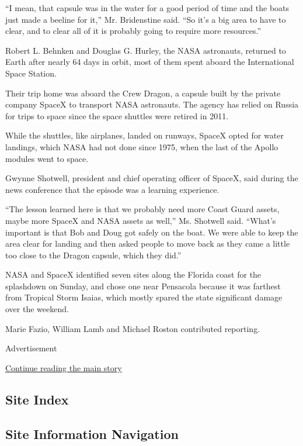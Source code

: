 ``I mean, that capsule was in the water for a good period of time and
the boats just made a beeline for it,'' Mr. Bridenstine said. ``So it's
a big area to have to clear, and to clear all of it is probably going to
require more resources.''

Robert L. Behnken and Douglas G. Hurley, the NASA astronauts, returned
to Earth after nearly 64 days in orbit, most of them spent aboard the
International Space Station.

Their trip home was aboard the Crew Dragon, a capsule built by the
private company SpaceX to transport NASA astronauts. The agency has
relied on Russia for trips to space since the space shuttles were
retired in 2011.

While the shuttles, like airplanes, landed on runways, SpaceX opted for
water landings, which NASA had not done since 1975, when the last of the
Apollo modules went to space.

Gwynne Shotwell, president and chief operating officer of SpaceX, said
during the news conference that the episode was a learning experience.

``The lesson learned here is that we probably need more Coast Guard
assets, maybe more SpaceX and NASA assets as well,'' Ms. Shotwell said.
``What's important is that Bob and Doug got safely on the boat. We were
able to keep the area clear for landing and then asked people to move
back as they came a little too close to the Dragon capsule, which they
did.''

NASA and SpaceX identified seven sites along the Florida coast for the
splashdown on Sunday, and chose one near Pensacola because it was
farthest from Tropical Storm Isaias, which mostly spared the state
significant damage over the weekend.

Marie Fazio, William Lamb and Michael Roston contributed reporting.

Advertisement

\protect\hyperlink{after-bottom}{Continue reading the main story}

\hypertarget{site-index}{%
\subsection{Site Index}\label{site-index}}

\hypertarget{site-information-navigation}{%
\subsection{Site Information
Navigation}\label{site-information-navigation}}


